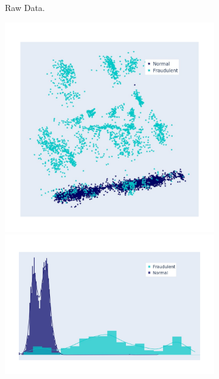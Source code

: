 \begin{figure}[h!]
\begin{subfigure}[]{0.3\linewidth}
\begin{tabular}{c|c|c|c}
		\end{tabular}
		\caption{Raw Data. }
		\label{fig:RawData_hist}
	\end{subfigure}
	\hspace{0.1em}%
	\begin{subfigure}[]{0.3\linewidth}	
		\includegraphics[width=\linewidth,trim=40 40 40 40,clip]{Figures/creditcard/PCA/SIMPOR-data-run-0-0}
		\includegraphics[width=\linewidth,trim=40 40 40 40,clip]{Figures/creditcard/PCA/SIMPOR-data-run-0-0_DIST}
		\begin{tabular}{c|c|c|c}

\end{tabular}
\end{subfigure}
\end{figure}
